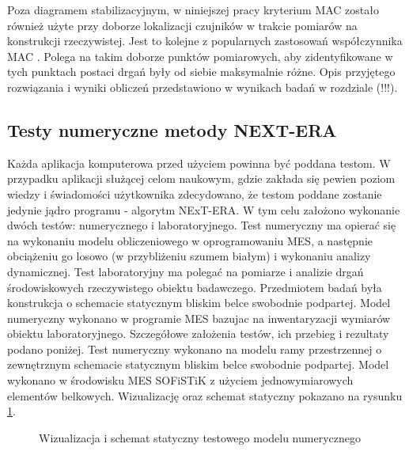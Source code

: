 Poza diagramem stabilizacyjnym, w niniejszej pracy kryterium MAC zostało również użyte przy doborze lokalizacji czujników w trakcie pomiarów na konstrukcji rzeczywistej. Jest to kolejne z popularnych zastosowań współczynnika MAC \parencite{Allemang2003}. Polega na takim doborze punktów pomiarowych, aby zidentyfikowane w tych punktach postaci drgań były od siebie maksymalnie różne. Opis przyjętego rozwiązania i wyniki obliczeń przedstawiono w wynikach badań w rozdziale (!!!).




\subsection{Testy numeryczne metody NEXT-ERA}
Każda aplikacja komputerowa przed użyciem powinna być poddana testom. W przypadku aplikacji służącej celom naukowym, gdzie zakłada się pewien poziom wiedzy i świadomości użytkownika zdecydowano, że testom poddane zostanie jedynie jądro programu - algorytm NExT-ERA. W tym celu założono wykonanie dwóch testów: numerycznego i laboratoryjnego. Test numeryczny ma opierać się na wykonaniu modelu obliczeniowego w oprogramowaniu MES, a następnie obciążeniu go losowo (w przybliżeniu szumem białym) i wykonaniu analizy dynamicznej. Test laboratoryjny ma polegać na pomiarze i analizie drgań środowiskowych rzeczywistego obiektu badawczego. Przedmiotem badań była konstrukcja o schemacie statycznym bliskim belce swobodnie podpartej. Model numeryczny wykonano w programie MES bazujac na inwentaryzacji wymiarów obiektu laboratoryjnego. Szczegółowe założenia testów, ich przebieg i rezultaty podano poniżej. Test numeryczny wykonano na modelu ramy przestrzennej o zewnętrznym schemacie statycznym bliskim belce swobodnie podpartej. Model wykonano w środowisku MES SOFiSTiK z użyciem jednowymiarowych elementów belkowych. Wizualizację oraz schemat statyczny pokazano na rysunku \ref{fig: test_beam_wis_model}.
\begin{figure}[h]
	\centering
	\captionsetup{justification=centering}
	\caption{Wizualizacja i schemat statyczny testowego modelu numerycznego}
	\label{fig: test_beam_wis_model}
\end{figure}





